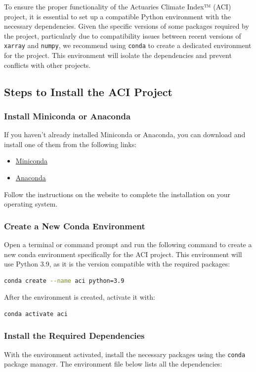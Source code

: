 \documentclass[a4paper,12pt]{article}
\begin{document}
To ensure the proper functionality of the Actuaries Climate Index™ (ACI) project, it is essential to set up a compatible Python environment with the necessary dependencies. Given the specific versions of some packages required by the project, particularly due to compatibility issues between recent versions of \texttt{xarray} and \texttt{numpy}, we recommend using \texttt{conda} to create a dedicated environment for the project. This environment will isolate the dependencies and prevent conflicts with other projects.

\subsection{Steps to Install the ACI Project}
\subsubsection{Install Miniconda or Anaconda}
If you haven't already installed Miniconda or Anaconda, you can download and install one of them from the following links:
\begin{itemize}
    \item \href{https://docs.conda.io/en/latest/miniconda.html}{Miniconda}
    \item \href{https://www.anaconda.com/products/distribution}{Anaconda}
\end{itemize}
Follow the instructions on the website to complete the installation on your operating system.

\subsubsection{Create a New Conda Environment}
Open a terminal or command prompt and run the following command to create a new conda environment specifically for the ACI project. This environment will use Python 3.9, as it is the version compatible with the required packages:

\begin{lstlisting}[language=bash]
conda create --name aci python=3.9
\end{lstlisting}

After the environment is created, activate it with:

\begin{lstlisting}[language=bash]
conda activate aci
\end{lstlisting}

\subsubsection{Install the Required Dependencies}
With the environment activated, install the necessary packages using the \texttt{conda} package manager. The environment file below lists all the dependencies:
\end{document}
